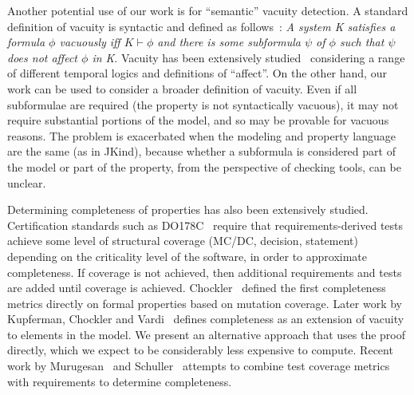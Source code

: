 Another potential use of our work is for ``semantic'' vacuity detection.  A standard definition of vacuity is syntactic and defined as follows~\cite{Kupferman:2006:SCF}: {\em A system K satisfies a formula $\phi$ vacuously iff $K \vdash \phi$ and there is some subformula $\psi$ of $\phi$ such that $\psi$ does not affect $\phi$ in K}.  Vacuity has been extensively studied~\cite{Gurfinkel:2012:RVB,Chockler2008,DBLP:Ben-DavidK13,Kupferman:2006:SCF,Chockler:2007,Beer1997} considering a range of different temporal logics and definitions of ``affect''.  On the other hand, our work can be used to consider a broader definition of vacuity.  Even if all subformulae are required (the property is not syntactically vacuous), it may not require substantial portions of the model, and so may be provable for vacuous reasons.  The problem is exacerbated when the modeling and property language are the same (as in JKind), because whether a subformula is considered part of the model or part of the property, from the perspective of checking tools, can be unclear.

Determining completeness of properties has also been extensively studied. Certification standards such as DO178C~\cite{DO178C} require that requirements-derived tests achieve some level of structural coverage (MC/DC, decision, statement) depending on the criticality level of the software, in order to approximate completeness.  If coverage is not achieved, then additional requirements and tests are added until coverage is achieved.  Chockler~\cite{Chockler2003} defined the first completeness metrics directly on formal properties based on mutation coverage.  Later work by Kupferman, Chockler and Vardi~\cite{Kupferman:2006:SCF} defines completeness as an extension of vacuity to elements in the model.  We present an alternative approach that uses the proof directly, which we expect to be considerably less expensive to compute.  Recent work by Murugesan~\cite{murugesan2015we} and Schuller~\cite{schuler_assessing_2011} attempts to combine test coverage metrics with requirements to determine completeness.




\iffalse
\begin{itemize}
    \item MUS's : checked
    \item Work on Alloy: checked
    \item Work that Teme pointed us to : will be added
    \item Anything else Elaheh has found : \%60 checked
\end{itemize}
\fi

